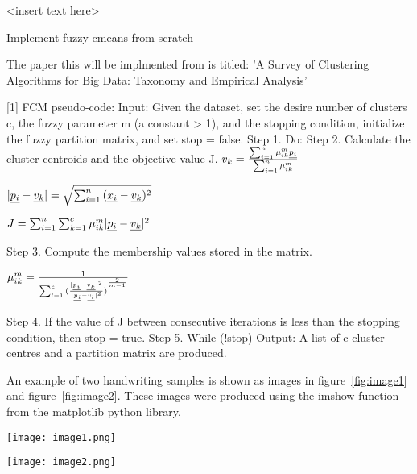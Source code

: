 <insert text here>

Implement fuzzy-cmeans from scratch

The paper this will be implmented from is titled: 'A Survey of Clustering Algorithms for Big Data: Taxonomy and Empirical Analysis'


[1]  
FCM pseudo-code:  
Input: Given the dataset, set the desire number of clusters c, the fuzzy parameter m (a constant > 1), and the stopping condition, initialize the fuzzy partition matrix, and set stop = false.  
Step 1. Do:  
Step 2. Calculate the cluster centroids and the objective value J.  
$\LARGE{v_{k}=\frac{\sum_{i=1}^n{{\mu^{m}_{{i}{k}}{{\underline{p_{i}}}}}}}{\sum_{i=1}^n{{\mu^{m}_{{i}{k}}}}}}$ 
   
     
$\LARGE{{\vert{\underline{p_{i}}}-{\underline{v_{k}}}\vert}=\sqrt{\sum_{i=1}^{n}{({\underline{x_{i}}}-{\underline{v_{k}}})^2}}}$  
  

$\LARGE{J=\sum_{i=1}^{n}{\sum_{k=1}^{c}{\mu^{m}_{{i}{k}}{\vert{\underline{p_{i}}}-{\underline{v_{k}}}\vert^{2}}}}}$  
  

Step 3. Compute the membership values stored in the matrix.  

$\LARGE{{\mu^{m}_{{i}{k}}}=\frac{1}{\sum_{l=1}^{c}{(\frac{{\vert{\underline{p_{i}}}-{\underline{v_{k}}}\vert^{2}}}{{\vert{\underline{p_{i}}}-{\underline{v_{l}}}\vert^{2}}})}^{\frac{2}{m-1}}}}$
  
    
Step 4. If the value of J between consecutive iterations is less than the stopping condition, then stop = true.  
Step 5. While (!stop)  
Output: A list of c cluster centres and a partition matrix are produced.   


An example of two handwriting samples is shown as images in figure~\ref{fig:image1} and figure~\ref{fig:image2}. These images were produced using the imshow function from the matplotlib python library.\newline

\begin{center}
\texttt{[image: image1.png]}
\end{center}

\begin{center}
\texttt{[image: image2.png]}
\end{center}    
        